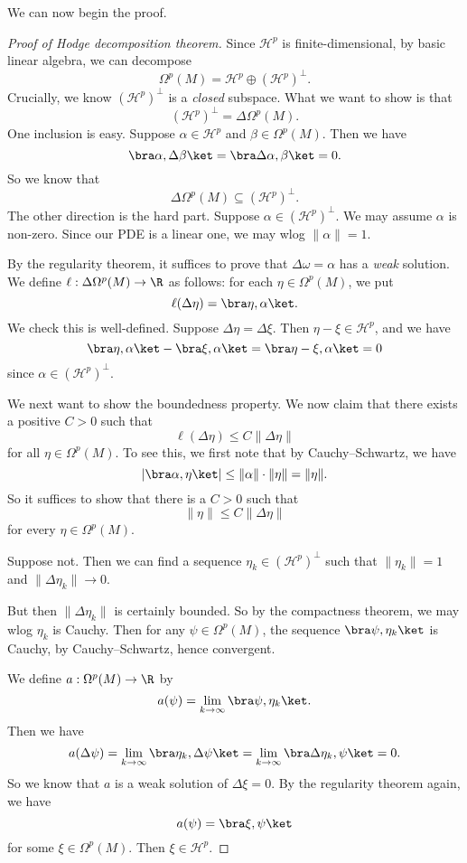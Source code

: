 \documentclass[a4paper]{article}
\begin{document}
We can now begin the proof.
\begin{proof}[Proof of Hodge decomposition theorem]
  Since $\mathcal{H}^p$ is finite-dimensional, by basic linear algebra, we can decompose
  \[
    \Omega^p(M) = \mathcal{H}^p \oplus (\mathcal{H}^p)^\perp.
  \]
  Crucially, we know $(\mathcal{H}^p)^\perp$ is a \emph{closed} subspace. What we want to show is that
  \[
    (\mathcal{H}^p)^\perp = \Delta \Omega^p(M).
  \]
  One inclusion is easy. Suppose $\alpha \in \mathcal{H}^p$ and $\beta \in \Omega^p(M)$. Then we have
  \[
    \bra \alpha, \Delta \beta\ket = \bra \Delta \alpha, \beta\ket = 0.
  \]
  So we know that
  \[
    \Delta \Omega^p(M) \subseteq (\mathcal{H}^p)^\perp.
  \]
  The other direction is the hard part. Suppose $\alpha \in (\mathcal{H}^p)^\perp$. We may assume $\alpha$ is non-zero. Since our PDE is a linear one, we may wlog $\|\alpha\| = 1$.

  By the regularity theorem, it suffices to prove that $\Delta \omega = \alpha$ has a \emph{weak} solution. We define $\ell: \Delta \Omega^p(M) \to \R$ as follows: for each $\eta \in \Omega^p(M)$, we put
  \[
    \ell (\Delta \eta) = \bra \eta, \alpha\ket.
  \]
  We check this is well-defined. Suppose $\Delta \eta = \Delta \xi$. Then $\eta - \xi \in \mathcal{H}^p$, and we have
  \[
    \bra \eta, \alpha\ket - \bra \xi, \alpha\ket = \bra \eta - \xi, \alpha \ket = 0
  \]
  since $\alpha \in (\mathcal{H}^p)^\perp$.

  We next want to show the boundedness property. We now claim that there exists a positive $C > 0$ such that
  \[
    \ell(\Delta \eta)\leq C \|\Delta \eta\|
  \]
  for all $\eta \in \Omega^p(M)$. To see this, we first note that by Cauchy--Schwartz, we have
  \[
    |\bra \alpha, \eta\ket| \leq \|\alpha\| \cdot \|\eta\| = \|\eta\|.
  \]
  So it suffices to show that there is a $C > 0$ such that
  \[
    \|\eta\| \leq C\|\Delta \eta\|
  \]
  for every $\eta \in \Omega^p(M)$.

  Suppose not. Then we can find a sequence $\eta_k \in (\mathcal{H}^p)^{\perp}$ such that $\|\eta_k\| = 1$ and $\|\Delta \eta_k\| \to 0$.

  But then $\|\Delta \eta_k\|$ is certainly bounded. So by the compactness theorem, we may wlog $\eta_k$ is Cauchy. Then for any $\psi \in \Omega^p(M)$, the sequence $\bra \psi, \eta_k\ket$ is Cauchy, by Cauchy--Schwartz, hence convergent.

  We define $a: \Omega^p(M) \to \R$ by
  \[
    a(\psi) = \lim_{k \to \infty} \bra \psi, \eta_k\ket.
  \]
  Then we have
  \[
    a(\Delta \psi) = \lim_{k \to \infty} \bra \eta_k, \Delta \psi\ket = \lim_{k \to \infty} \bra \Delta \eta_k, \psi\ket = 0.
  \]
  So we know that $a$ is a weak solution of $\Delta \xi = 0$. By the regularity theorem again, we have
  \[
    a(\psi) = \bra \xi, \psi\ket
  \]
  for some $\xi \in \Omega^p(M)$. Then $\xi \in \mathcal{H}^p$.


\end{proof}
\end{document}
